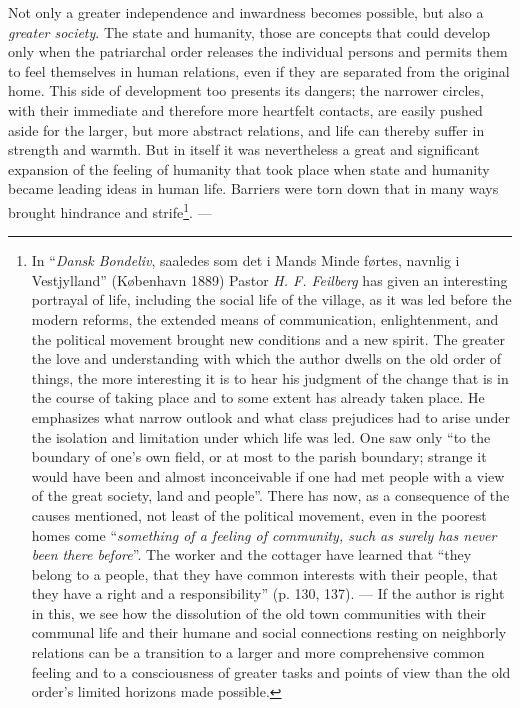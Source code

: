 \documentclass[12pt,a4paper,openany]{book}
\begin{document}
Not only a greater independence and inwardness becomes
possible, but also a \emph{greater society}. The state and
humanity, those are concepts that could develop only when the
patriarchal order releases the individual persons and
permits them to feel themselves in human relations, even if they
are separated from the original home. This side of
development too presents its dangers; the narrower circles, with
their immediate and therefore more heartfelt contacts, are
easily pushed aside for the larger, but more abstract relations, and
life can thereby suffer in strength and warmth. But in itself
it was nevertheless a great and significant expansion of
the feeling of humanity that took place when state and
humanity became leading ideas in human life. Barriers
were torn down that in many ways brought hindrance and
strife\footnote{In ``\emph{Dansk Bondeliv}, saaledes som det i Mands Minde førtes, navnlig
i Vestjylland'' (København 1889) Pastor \emph{H. F. Feilberg} has given
an interesting portrayal of life, including the social life of
the village, as it was led before the modern reforms, the
extended means of communication, enlightenment, and the political movement brought
new conditions and a new spirit. The greater the love and
understanding with which the author dwells on the old order of things, the more interesting it is to hear his judgment of
the change that is in the course of taking place and to some extent has already
taken place. He emphasizes what narrow outlook and what
class prejudices had to arise under the isolation and limitation
under which life was led. One saw only ``to the boundary of one's own field,
or at most to the parish boundary; strange it would have been and almost inconceivable
if one had met people with a view of the great society, land and people''. There has now,
as a consequence of the causes mentioned, not least of the political
movement, even in the poorest homes come ``\emph{something of a
feeling of community, such as surely has never been there before}''. The worker and
the cottager have learned that ``they belong to a people, that they have common
interests with their people, that they have a right and a responsibility'' (p. 130,
137). --- If the author is right in this, we see how the dissolution
of the old town communities with their communal life and their humane and social connections resting on
neighborly relations can be
a transition to a larger and more comprehensive common feeling and to
a consciousness of greater tasks and points of view than the old
order's limited horizons made possible.}. ---
\end{document}
